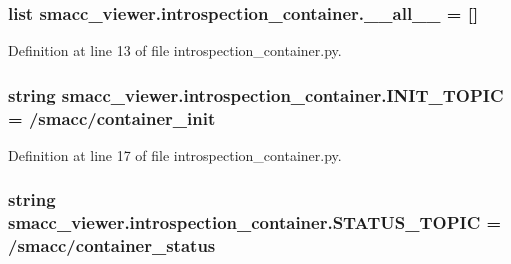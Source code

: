\subsubsection[{\texorpdfstring{\+\_\+\+\_\+all\+\_\+\+\_\+}{__all__}}]{\setlength{\rightskip}{0pt plus 5cm}list smacc\+\_\+viewer.\+introspection\+\_\+container.\+\_\+\+\_\+all\+\_\+\+\_\+ = \mbox{[}\textquotesingle{}\mbox{]}\hspace{0.3cm}{\ttfamily [private]}}\hypertarget{namespacesmacc__viewer_1_1introspection__container_af073584e4a098be8fd1edaaed187d9e4}{}\label{namespacesmacc__viewer_1_1introspection__container_af073584e4a098be8fd1edaaed187d9e4}


Definition at line 13 of file introspection\+\_\+container.\+py.

\subsubsection[{\texorpdfstring{I\+N\+I\+T\+\_\+\+T\+O\+P\+IC}{INIT_TOPIC}}]{\setlength{\rightskip}{0pt plus 5cm}string smacc\+\_\+viewer.\+introspection\+\_\+container.\+I\+N\+I\+T\+\_\+\+T\+O\+P\+IC = \textquotesingle{}/smacc/container\+\_\+init\textquotesingle{}}\hypertarget{namespacesmacc__viewer_1_1introspection__container_a581804d065a1abc917b27a1ce8c38d1d}{}\label{namespacesmacc__viewer_1_1introspection__container_a581804d065a1abc917b27a1ce8c38d1d}


Definition at line 17 of file introspection\+\_\+container.\+py.

\subsubsection[{\texorpdfstring{S\+T\+A\+T\+U\+S\+\_\+\+T\+O\+P\+IC}{STATUS_TOPIC}}]{\setlength{\rightskip}{0pt plus 5cm}string smacc\+\_\+viewer.\+introspection\+\_\+container.\+S\+T\+A\+T\+U\+S\+\_\+\+T\+O\+P\+IC = \textquotesingle{}/smacc/container\+\_\+status\textquotesingle{}}\hypertarget{namespacesmacc__viewer_1_1introspection__container_af478107f01151ac7abee0291a9cb2466}{}\label{namespacesmacc__viewer_1_1introspection__container_af478107f01151ac7abee0291a9cb2466}


